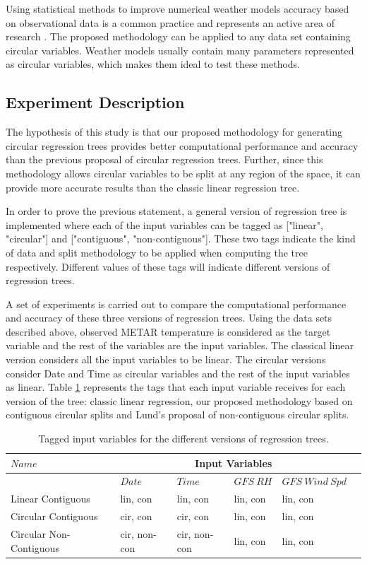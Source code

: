 \documentclass[times,twocolumn,final,authoryear]{elsarticle}
\begin{document}
Using statistical methods to improve numerical weather models accuracy based on observational data is a common practice and represents an active area of research \citep{Larraondoetal2014, Salamehetal2009}. The proposed methodology can be applied to any data set containing circular variables. Weather models usually contain many parameters represented as circular variables, which makes them ideal to test these methods.

\subsection{Experiment Description}

The hypothesis of this study is that our proposed methodology for generating circular regression trees provides better computational performance and accuracy than the previous proposal of circular regression trees. Further, since this methodology allows circular variables to be split at any region of the space, it can provide more accurate results than the classic linear regression tree.

In order to prove the previous statement, a general version of regression tree is implemented where each of the input variables can be tagged as ["linear", "circular"] and ["contiguous", "non-contiguous"]. These two tags indicate the kind of data and split methodology to be applied when computing the tree respectively. Different values of these tags will indicate different versions of regression trees.

A set of experiments is carried out to compare the computational performance and accuracy of these three versions of regression trees. Using the data sets described above, observed METAR temperature is considered as the target variable and the rest of the variables are the input variables. The classical linear version considers all the input variables to be linear. The circular versions consider Date and Time as circular variables and the rest of the input variables as linear. Table \ref{t3} represents the tags that each input variable receives for each version of the tree: classic linear regression, our proposed methodology based on contiguous circular splits and Lund's proposal of non-contiguous circular splits.

\begin{table}[t]
\caption{Tagged input variables for the different versions of regression trees.}\label{t3}
\begin{center}
\begin{tabular}{llllll}
\hline\hline
$Name$ & \multicolumn{4}{c}{Input Variables} \\ \hline
 & $Date$ & $Time$ & $GFS\ RH$ & $GFS\ Wind\ Spd$\\
\hline
Linear Contiguous & lin, con & lin, con & lin, con & lin, con\\
Circular Contiguous & cir, con & cir, con & lin, con & lin, con\\
Circular Non-Contiguous & cir, non-con & cir, non-con & lin, con & lin, con\\
\hline
\end{tabular}
\end{center}
\end{table}
\end{document}
